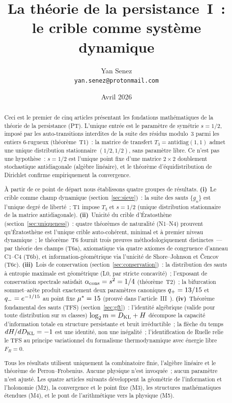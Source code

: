 \documentclass[12pt,a4paper]{article}
\title{\textbf{La théorie de la persistance~I~:\\le crible comme système dynamique}}
\author{Yan Senez\\\texttt{yan.senez@protonmail.com}}
\date{Avril 2026}
\begin{document}
\maketitle

\begin{abstract}
Ceci est le premier de cinq articles présentant les fondations
mathématiques de la théorie de la persistance (PT). L'unique entrée
est le paramètre de symétrie $s = 1/2$, imposé par les
auto-transitions interdites de la suite des résidus modulo~$3$ parmi
les entiers $6$-rugueux (théorème~T1)~: la matrice de transfert
$T_3 = \mathrm{antidiag}(1,1)$ admet une unique distribution
stationnaire $(1/2, 1/2)$, sans paramètre libre. Ce n'est pas une
hypothèse~: $s = 1/2$ est l'unique point fixe d'une matrice
$2 \times 2$ doublement stochastique antidiagonale (algèbre
linéaire), et le théorème d'équidistribution de Dirichlet confirme
empiriquement la convergence.

À partir de ce point de départ nous établissons quatre groupes de
résultats.
\textbf{(i)}~Le crible comme champ dynamique (section~\ref{sec:sieve})~:
la suite des sauts $\{g_n\}$ est l'unique degré de liberté~;
T1 impose $T_3$ et $s = 1/2$ (unique distribution stationnaire de la
matrice antidiagonale).
\textbf{(ii)}~Unicité du crible d'Ératosthène (section~\ref{sec:uniqueness})~:
quatre théorèmes de naturalité (N1--N4) prouvent qu'Ératosthène est
l'unique crible auto-cohérent, minimal et à premier niveau dynamique~; le
théorème~T6 fournit trois preuves méthodologiquement distinctes~--- par théorie des
champs (T6a), axiomatique via quatre axiomes de congruence d'anneau
C1--C4 (T6b), et information-géométrique via l'unicité de
Shore--Johnson et Čencov (T6c).
\textbf{(iii)}~Lois de conservation (section~\ref{sec:conservation})~:
la distribution des sauts à entropie maximale est géométrique (L0,
par stricte concavité)~; l'exposant de conservation spectrale
satisfait $\alpha_{\rm cons} = s^2 = 1/4$ (théorème~T2)~; la
bifurcation sommet--arête produit exactement deux paramètres
canoniques $q_{+} = 13/15$ et $q_{-} = e^{-1/15}$ au point fixe
${\mu^{*}} = 15$ (prouvé dans l'article~III~\cite{companion_M3}).
\textbf{(iv)}~Théorème fondamental des sauts (TFS)
(section~\ref{sec:gft})~:
l'identité algébrique (valide pour toute distribution sur $m$ classes)
$\log_2 m = D_{\mathrm{KL}} + H$ décompose la
capacité d'information totale en structure persistante et bruit
irréductible~; la flèche du temps $dH/dD_{\mathrm{KL}} = -1$ est une identité,
non une inégalité~; l'identification de Ruelle relie le TFS au
principe variationnel du formalisme thermodynamique avec énergie
libre $F_R = 0$.

Tous les résultats utilisent uniquement la combinatoire finie,
l'algèbre linéaire et le théorème de Perron--Frobenius. Aucune
physique n'est invoquée~; aucun paramètre n'est ajusté. Les quatre
articles suivants développent la géométrie de l'information et
l'holonomie (M2), la convergence et le point fixe (M3), les
structures mathématiques étendues (M4), et le pont de l'arithmétique
vers la physique (M5).
\end{abstract}
\end{document}
